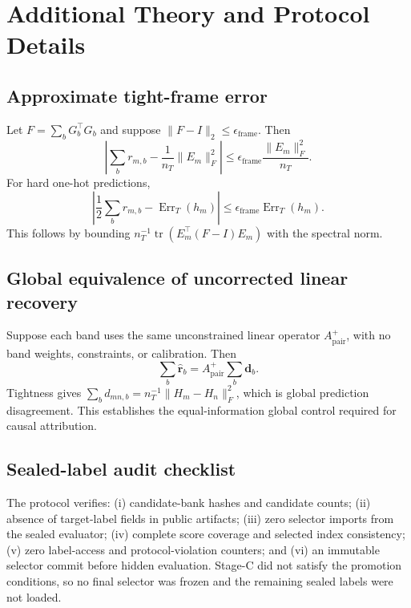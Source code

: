 \section{Additional Theory and Protocol Details}

\subsection{Approximate tight-frame error}
\label{app:frame_error}

Let $F=\sum_bG_b^\top G_b$ and suppose
$\lVert F-I\rVert_2\leq\epsilon_{\mathrm{frame}}$. Then
\begin{equation}
\left|
\sum_b r_{m,b}-\frac{1}{n_T}\lVert E_m\rVert_F^2
\right|
\leq
\epsilon_{\mathrm{frame}}
\frac{\lVert E_m\rVert_F^2}{n_T}.
\end{equation}
For hard one-hot predictions,
\begin{equation}
\left|
\frac12\sum_b r_{m,b}-\operatorname{Err}_T(h_m)
\right|
\leq
\epsilon_{\mathrm{frame}}\operatorname{Err}_T(h_m).
\end{equation}
This follows by bounding
$n_T^{-1}\operatorname{tr}(E_m^\top(F-I)E_m)$ with the spectral norm.

\subsection{Global equivalence of uncorrected linear recovery}
\label{app:global_equivalence}

Suppose each band uses the same unconstrained linear operator
$A_{\mathrm{pair}}^+$, with no band weights, constraints, or calibration. Then
\begin{equation}
\sum_b\widehat{\mathbf r}_b
=A_{\mathrm{pair}}^+\sum_b\mathbf d_b.
\end{equation}
Tightness gives
$\sum_bd_{mn,b}=n_T^{-1}\lVert H_m-H_n\rVert_F^2$, which is global
prediction disagreement. This establishes the equal-information global
control required for causal attribution.

\subsection{Sealed-label audit checklist}

The protocol verifies: (i) candidate-bank hashes and candidate counts;
(ii) absence of target-label fields in public artifacts; (iii) zero selector
imports from the sealed evaluator; (iv) complete score coverage and selected
index consistency; (v) zero label-access and protocol-violation counters; and
(vi) an immutable selector commit before hidden evaluation. Stage-C did not
satisfy the promotion conditions, so no final selector was frozen and the
remaining sealed labels were not loaded.

